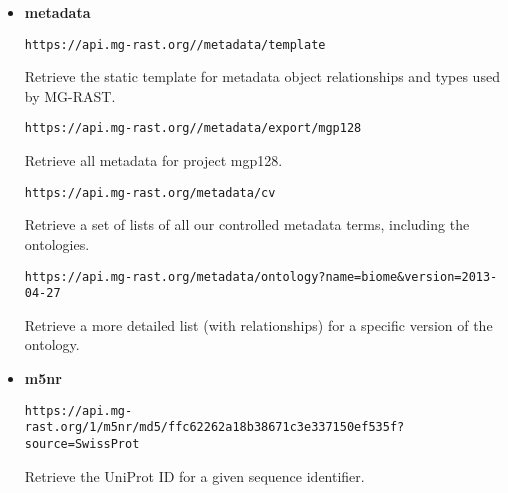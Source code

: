 \begin{itemize}
\item
\textbf{metadata}
\begin{small}
\begin{lstlisting}
https://api.mg-rast.org//metadata/template
\end{lstlisting}
\end{small} Retrieve the static template for metadata object relationships and types used by MG-RAST.
\begin{small}
\begin{lstlisting}
https://api.mg-rast.org//metadata/export/mgp128
\end{lstlisting}
\end{small} Retrieve all metadata for project mgp128.
\begin{small}
\begin{lstlisting}
https://api.mg-rast.org/metadata/cv
\end{lstlisting}
\end{small} Retrieve a set of lists of all our controlled metadata terms, including the ontologies.
\begin{small}
\begin{lstlisting}
https://api.mg-rast.org/metadata/ontology?name=biome&version=2013-04-27
\end{lstlisting}
\end{small} Retrieve a more detailed list (with relationships) for a specific version of the ontology.

\item
\textbf{m5nr}
\begin{small}
\begin{lstlisting}
https://api.mg-rast.org/1/m5nr/md5/ffc62262a18b38671c3e337150ef535f?source=SwissProt
\end{lstlisting}
\end{small} Retrieve the UniProt ID for a given sequence identifier.

\end{itemize}
